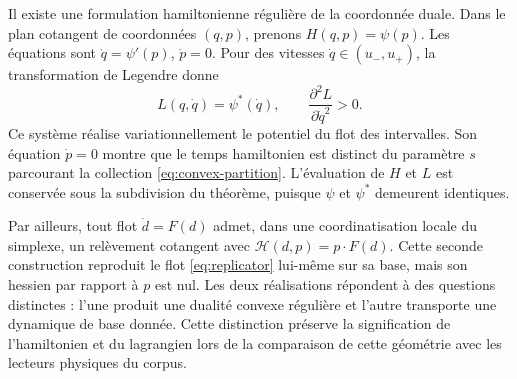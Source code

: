 Il existe une formulation hamiltonienne régulière de la coordonnée duale. Dans le
plan cotangent de coordonnées \((q,p)\), prenons
\(H(q,p)=\psi(p)\). Les équations sont
\(\dot q=\psi'(p)\), \(\dot p=0\). Pour des vitesses
\(\dot q\in(u_-,u_+)\), la transformation de Legendre donne
\[
 L(q,\dot q)=\psi^*(\dot q),\qquad
 \frac{\partial^2L}{\partial\dot q^2}>0.
\]
Ce système réalise variationnellement le potentiel du flot des intervalles. Son équation \(\dot p=0\) montre que le temps hamiltonien est distinct du paramètre \(s\) parcourant la collection \eqref{eq:convex-partition}. L'évaluation de \(H\) et \(L\) est conservée sous la subdivision du théorème, puisque \(\psi\) et \(\psi^*\) demeurent identiques.

Par ailleurs, tout flot \(\dot d=F(d)\) admet, dans une coordinatisation locale du simplexe, un relèvement cotangent avec \(\mathscr H(d,p)=p\cdot F(d)\). Cette seconde construction reproduit le flot \eqref{eq:replicator} lui-même sur sa base, mais son hessien par rapport à \(p\) est nul. Les deux réalisations répondent à des questions distinctes : l'une produit une dualité convexe régulière et l'autre transporte une dynamique de base donnée. Cette distinction préserve la signification de l'hamiltonien et du lagrangien lors de la comparaison de cette géométrie avec les lecteurs physiques du corpus.
